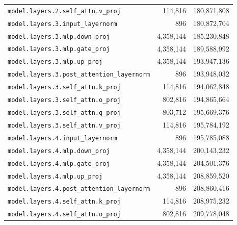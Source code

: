 \documentclass[10pt,a4paper]{article}
\theoremstyle{definition}
\begin{document}
\begin{appendices}
\begin{longtable}{p{9.5cm}rr}
\texttt{model.\allowbreak{}layers.\allowbreak{}2.\allowbreak{}self\_attn.\allowbreak{}v\_proj} & 114,816 & 180,871,808 \\
\texttt{model.\allowbreak{}layers.\allowbreak{}3.\allowbreak{}input\_layernorm} & 896 & 180,872,704 \\
\texttt{model.\allowbreak{}layers.\allowbreak{}3.\allowbreak{}mlp.\allowbreak{}down\_proj} & 4,358,144 & 185,230,848 \\
\texttt{model.\allowbreak{}layers.\allowbreak{}3.\allowbreak{}mlp.\allowbreak{}gate\_proj} & 4,358,144 & 189,588,992 \\
\texttt{model.\allowbreak{}layers.\allowbreak{}3.\allowbreak{}mlp.\allowbreak{}up\_proj} & 4,358,144 & 193,947,136 \\
\texttt{model.\allowbreak{}layers.\allowbreak{}3.\allowbreak{}post\_attention\_layernorm} & 896 & 193,948,032 \\
\texttt{model.\allowbreak{}layers.\allowbreak{}3.\allowbreak{}self\_attn.\allowbreak{}k\_proj} & 114,816 & 194,062,848 \\
\texttt{model.\allowbreak{}layers.\allowbreak{}3.\allowbreak{}self\_attn.\allowbreak{}o\_proj} & 802,816 & 194,865,664 \\
\texttt{model.\allowbreak{}layers.\allowbreak{}3.\allowbreak{}self\_attn.\allowbreak{}q\_proj} & 803,712 & 195,669,376 \\
\texttt{model.\allowbreak{}layers.\allowbreak{}3.\allowbreak{}self\_attn.\allowbreak{}v\_proj} & 114,816 & 195,784,192 \\
\texttt{model.\allowbreak{}layers.\allowbreak{}4.\allowbreak{}input\_layernorm} & 896 & 195,785,088 \\
\texttt{model.\allowbreak{}layers.\allowbreak{}4.\allowbreak{}mlp.\allowbreak{}down\_proj} & 4,358,144 & 200,143,232 \\
\texttt{model.\allowbreak{}layers.\allowbreak{}4.\allowbreak{}mlp.\allowbreak{}gate\_proj} & 4,358,144 & 204,501,376 \\
\texttt{model.\allowbreak{}layers.\allowbreak{}4.\allowbreak{}mlp.\allowbreak{}up\_proj} & 4,358,144 & 208,859,520 \\
\texttt{model.\allowbreak{}layers.\allowbreak{}4.\allowbreak{}post\_attention\_layernorm} & 896 & 208,860,416 \\
\texttt{model.\allowbreak{}layers.\allowbreak{}4.\allowbreak{}self\_attn.\allowbreak{}k\_proj} & 114,816 & 208,975,232 \\
\texttt{model.\allowbreak{}layers.\allowbreak{}4.\allowbreak{}self\_attn.\allowbreak{}o\_proj} & 802,816 & 209,778,048 \\

\end{longtable}
\end{appendices}
\end{document}
